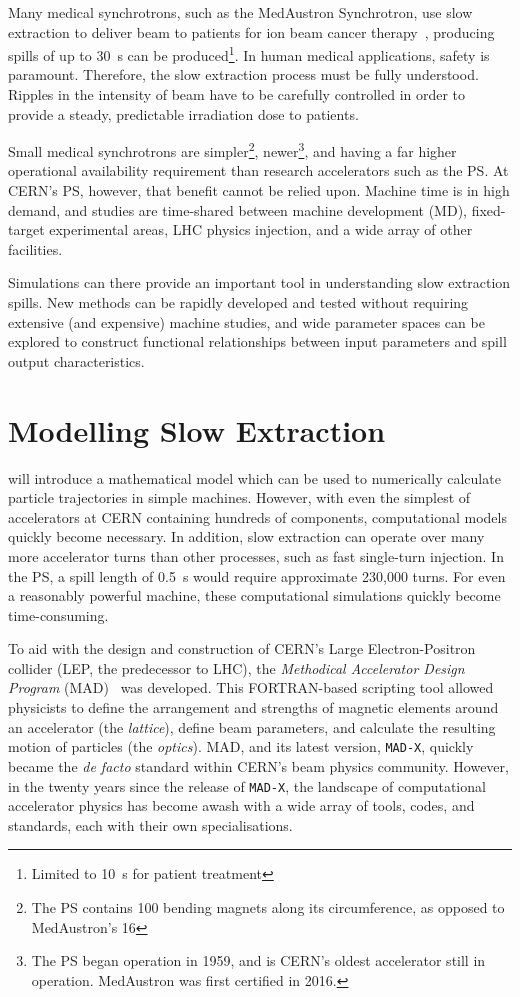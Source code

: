 \documentclass[11pt]{report}
\begin{document}
Many medical synchrotrons, such as the MedAustron Synchrotron, use slow extraction to deliver beam to patients for ion beam cancer therapy~\cite{ArrutiaSota:2845862}, producing spills of up to \qty{30}{\second} can be produced\footnote{Limited to \qty{10}{\second} for patient treatment}. In human medical applications, safety is paramount. Therefore, the slow extraction process must be fully understood. Ripples in the intensity of beam have to be carefully controlled in order to provide a steady, predictable irradiation dose to patients.

Small medical synchrotrons are simpler\footnote{The PS contains 100 bending magnets along its circumference, as opposed to MedAustron's 16}, newer\footnote{The PS began operation in 1959, and is CERN's oldest accelerator still in operation. MedAustron was first certified in 2016.}, and having a far higher operational availability requirement than research accelerators such as the PS. At CERN's PS, however, that benefit cannot be relied upon. Machine time is in high demand, and studies are time-shared between machine development (MD), fixed-target experimental areas, LHC physics injection, and a wide array of other facilities. 

Simulations can there provide an important tool in understanding slow extraction spills. New methods can be rapidly developed and tested without requiring extensive (and expensive) machine studies, and wide parameter spaces can be explored to construct functional relationships between input parameters and spill output characteristics. 

\section{Modelling Slow Extraction}

\label{sec:matrix} will introduce a mathematical model which can be used to numerically calculate particle trajectories in simple machines. However, with even the simplest of accelerators at CERN containing hundreds of components, computational models quickly become necessary. In addition, slow extraction can operate over many more accelerator turns than other processes, such as fast single-turn injection. In the PS, a spill length of \qty{0.5}{\second} would require approximate 230,000 turns. For even a reasonably powerful machine, these computational simulations quickly become time-consuming. 

To aid with the design and construction of CERN's Large Electron-Positron collider (LEP, the predecessor to LHC), the \textit{Methodical Accelerator Design Program} (MAD)~\cite{Iselin:MAD} was developed. This FORTRAN-based scripting tool allowed physicists to define the arrangement and strengths of magnetic elements around an accelerator (the \textit{lattice}), define beam parameters, and calculate the resulting motion of particles (the \textit{optics}). MAD, and its latest version, \verb|MAD-X|, quickly became the \textit{de facto} standard within CERN's beam physics community. However, in the twenty years since the release of \verb|MAD-X|, the landscape of computational accelerator physics has become awash with a wide array of tools, codes, and standards, each with their own specialisations. 
\end{document}
